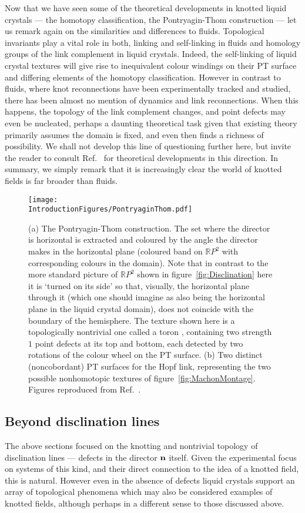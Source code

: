Now that we have seen some of the theoretical developments in knotted liquid crystals --- the homotopy classification, the Pontryagin-Thom construction --- let us remark again on the similarities and differences to fluids. Topological invariants play a vital role in both, linking and self-linking in fluids and homology groups of the link complement in liquid crystals. Indeed, the self-linking of liquid crystal textures will give rise to inequivalent colour windings on their PT surface and differing elements of the homotopy classification. However in contrast to fluids, where knot reconnections have been experimentally tracked and studied, there has been almost no mention of dynamics and link reconnections. When this happens, the topology of the link complement changes, and point defects may even be nucleated, perhaps a daunting theoretical task given that existing theory primarily assumes the domain is fixed, and even then finds a richness of possibility. We shall not develop this line of questioning further here, but invite the reader to consult Ref.~\citep{Machon2017} for theoretical developments in this direction. In summary, we simply remark that it is increasingly clear the world of knotted fields is far broader than fluids.

\begin{figure}[htbp]
\centering
\texttt{[image: \\IntroductionFigures/PontryaginThom.pdf]}
\caption{(a) The Pontryagin-Thom construction. The set where the director is horizontal is extracted and coloured by the angle the director makes in the horizontal plane (coloured band on $\mathbb{R}P^2$ with corresponding colours in the domain). Note that in contrast to the more standard picture of $\mathbb{R}P^2$ shown in figure~\ref{fig:Disclination} here it is `turned on its side' so that, visually, the horizontal plane through it (which one should imagine as also being the horizontal plane in the liquid crystal domain), does not coincide with the boundary of the hemisphere. The texture shown here is a topologically nontrivial one called a toron \citep{Smalyukh2010}, containing two strength $1$ point defects at its top and bottom, each detected by two rotations of the colour wheel on the PT surface. (b) Two distinct (noncobordant) PT surfaces for the Hopf link, representing the two possible nonhomotopic textures of figure~\ref{fig:MachonMontage}. Figures reproduced from Ref.~\citep{AlexanderBook,MachonThesis}.}
\label{fig:PT}
\end{figure}
\subsection{Beyond disclination lines}
The above sections focused on the knotting and nontrivial topology of disclination lines --- defects in the director $\bf n$ itself. Given the experimental focus on systems of this kind, and their direct connection to the idea of a knotted field, this is natural. However even in the absence of defects liquid crystals support an array of topological phenomena which may also be considered examples of knotted fields, although perhaps in a different sense to those discussed above. 

